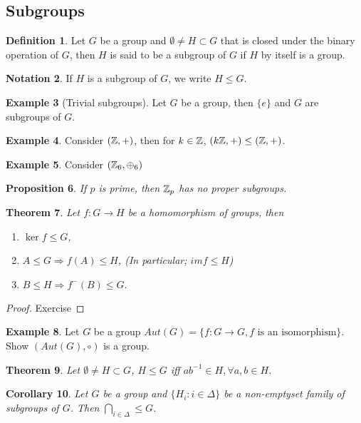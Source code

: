 \documentclass[leqno,DIV=calc,paper=a4,fontsize=11pt]{article}
\newtheorem{thm}{Theorem}[section]
\newtheorem{prop}[thm]{Proposition}
\newtheorem{cor}[thm]{Corollary}
\theoremstyle{definition}
\newtheorem{defn}[thm]{Definition}
\newtheorem{exmp}[thm]{Example}
\newtheorem{notn}[thm]{Notation}
\theoremstyle{plain}
\theoremstyle{remark}
\begin{document}
\subsection{Subgroups}
\begin{defn}
Let $G$ be a group and $\emptyset\neq H\subset G$ that is closed under the binary operation of $G$, then $H$ is said to be a subgroup of $G$ if $H$ by itself is a group.
\end{defn}
\begin{notn}
If $H$ is a subgroup of $G$, we write $H\leq G$.
\end{notn}
\begin{exmp}[Trivial subgroups]
Let $G$ be a group, then $\{e\}$ and $G$ are subgroups of $G$.
\end{exmp}
\begin{exmp}
Consider $(\Bbb Z, +)$, then for $k\in \Bbb Z$, $(k\Bbb Z,+)\leq (\Bbb Z,+)$.
\end{exmp}
\begin{exmp}
Consider $(\Bbb Z_6,\oplus_6)$

\end{exmp}

\begin{prop}
If $p$ is prime, then $\Bbb Z_p$  has no proper subgroups.
\end{prop}

\begin{thm}
Let $f:G\to H$ be a homomorphism of groups, then
\begin{enumerate}
  \item $\ker f\leq G$,
  \item $A\leq G\Rightarrow f(A)\leq H$, (In particular; $im f\leq H$)
  \item $B\leq H\Rightarrow f^{-}(B)\leq G.$
\end{enumerate}
\end{thm}
\begin{proof}
Exercise
\end{proof}

\begin{exmp}
Let $G$ be a group $Aut (G)=\{f:G\to G, f \text{ is an isomorphism}\}$. Show $(Aut(G),\circ)$ is a group.
\end{exmp}

\begin{thm}
Let $\emptyset\neq H\subset G$, $H\leq G$ iff $ab^{-1}\in H,\forall a,b\in H$.
\end{thm}

\begin{cor}
Let $G$ be a group and $\{H_i:i\in \Delta\}$ be a non-emptyset family of subgroups of $G$. Then $\bigcap_{i\in \Delta}\leq G$.
\end{cor}
\end{document}
